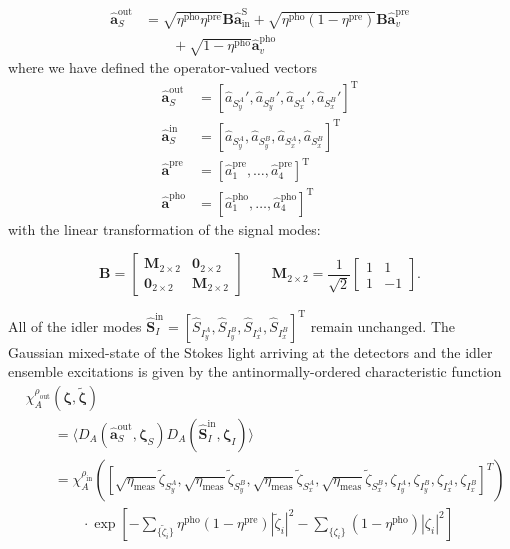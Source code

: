 \documentclass[aps,twocolumn,secnumarabic,amsmath,amssymb,pra,groupedaddress,
showpacs, showkeys]{revtex4-1}
\newcommand{\pna}[1]{\left(#1\right)}
\newcommand{\pnb}[1]{\left[#1\right]}
\newcommand{\eqn}[1]{
\begin{equation}
	#1
\end{equation}
}
\begin{document}
\begin{align}
\mathbf{\hat{a}}^{\textrm{out}}_S & = 
\sqrt{\eta^{\textrm{pho}}\eta^{\textrm{pre}}} \mathbf{B} \mathbf{\hat{a}}^{\textrm{S}}_{\textrm{in}}
+\sqrt{\eta^{\textrm{pho}}\pna{1-\eta^{\textrm{pre}}}}\mathbf{B} \mathbf{\hat{a}}^{\textrm{pre}}_v
 \nonumber \\ & \qquad +\sqrt{1-\eta^{\textrm{pho}}}\mathbf{\hat{a}}^{\textrm{pho}}_v
\end{align}
where we have defined the operator-valued vectors
\begin{align}
	\mathbf{\hat{a}}^{\textrm{out}}_S&=\pnb{\hat{a}_{S^A_y}',\hat{a}_{S^B_y}',\hat{a}_{S^A_x}',\hat{a}_{S^B_x}'}^{\textrm{T}} \nonumber\\
	\mathbf{\hat{a}}_{S}^{\textrm{in}}&=\pnb{\hat{a}_{S^A_y},\hat{a}_{S^B_y},\hat{a}_{S^A_x},\hat{a}_{S^B_x}}^{\textrm{T}} \nonumber\\
	\mathbf{\hat{a}}^{\textrm{pre}}&=\pnb{\hat{a}_1^{\textrm{pre}},\ldots, \hat{a}_4^{\textrm{pre}}}^{\textrm{T}} \nonumber\\
	\mathbf{\hat{a}}^{\textrm{pho}}&=\pnb{\hat{a}^{\textrm{pho}}_1,\ldots, \hat{a}^{\textrm{pho}}_4}^{\textrm{T}}
\end{align}
with the linear transformation of the signal modes:
\eqn{ 
\mathbf{B}=
\left[ 
\begin{array}{cc}
\mathbf{M}_{2\times 2} & \mathbf{0}_{2\times 2} \\
\mathbf{0}_{2\times 2} & \mathbf{M}_{2\times 2}
\end{array} 
\right]
\qquad 
\mathbf{M}_{2\times 2}=
\frac{1}{\sqrt{2}}\left[ 
\begin{array}{cc}
1 & 1 \\
1 & -1\end{array} \right].\label{eqn:chap3:linear_beamsplitter}}
All of the idler modes
$\mathbf{\hat{S}}_{{I}}^{\textrm{in}}=\pnb{\hat{S}_{I^A_y},\hat{S}_{I^B_y},\hat{S}_{I^A_x},\hat{S}_{I^B_x}}^{\textrm{T}}$
remain unchanged. The Gaussian mixed-state of the Stokes light arriving at the
detectors and the idler ensemble excitations is given by the
antinormally-ordered characteristic function
\begin{align}
	& \chi_A^{\rho_{\textrm{out}}}\pna{\bm{\zeta}, \bm{\tilde{\zeta}}}
        \nonumber \\
	& \qquad =\langle D_A\pna{\mathbf{\hat{a}}_S^{\textrm{out}}, \bm{\zeta}_S} D_A\pna{\mathbf{\hat{S}}_I^{\textrm{in}}, \bm{\zeta}_I} \rangle\nonumber \\
	& \qquad = \chi_A^{\rho_{\textrm{in}}}\pna{\pnb{\sqrt{\eta_{\textrm{meas}}}\tilde{\zeta}_{S^A_y},\sqrt{\eta_{\textrm{meas}}}\tilde{\zeta}_{S^B_y},\sqrt{\eta_{\textrm{meas}}}\tilde{\zeta}_{S^A_x},\sqrt{\eta_{\textrm{meas}}}\tilde{\zeta}_{S^B_x},
    \zeta_{I^A_y},\zeta_{I^B_y},\zeta_{I^A_x},\zeta_{I^B_x}}^{T}} \nonumber \\
    & \qquad \qquad \cdot \exp\pnb{-\sum_{\{\tilde{\zeta}_i\}}\eta^{\textrm{pho}}\pna{1- \eta^{\textrm{pre}}}|\tilde{\zeta}_i|^2-\sum_{\{{\zeta}_i\}}\pna{1-\eta^{\textrm{pho}}}|{\zeta}_i|^2} \label{eqn:chap3:chia_orig}
\end{align}
\end{document}
